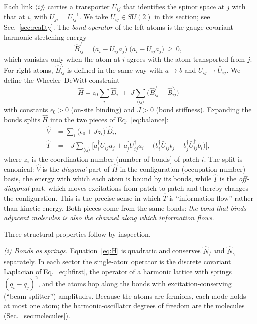 \documentclass[reprint,aps,prd,amsmath,amssymb,superscriptaddress,nofootinbib,floatfix]{revtex4-2}
\theoremstyle{plain}
\theoremstyle{definition}
\theoremstyle{remark}
\newcommand{\Lat}{\ensuremath{/}}                 %
\newcommand{\Rat}{\ensuremath{\backslash}}        %
\newcommand{\Hc}{\hat{H}}
\newcommand{\Tc}{\hat{T}}
\newcommand{\Vc}{\hat{V}}
\newcommand{\SU}{SU(2)}
\begin{document}
Each link $\langle ij\rangle$ carries a transporter $U_{ij}$ that identifies the spinor space at $j$ with that at
$i$, with $U_{ji}=U_{ij}^{-1}$. We take $U_{ij}\in\SU$ in this section; see Sec.~\ref{sec:reality}. The
\emph{bond operator} of the left atoms is the gauge-covariant harmonic stretching energy
\begin{equation}
\hat B^{\Lat}_{ij}=\big(a_i-U_{ij}a_j\big)^\dagger\big(a_i-U_{ij}a_j\big)\ \ge\ 0 ,
\label{eq:bond}
\end{equation}
which vanishes only when the atom at $i$ agrees with the atom transported from $j$. For right atoms,
$\hat B^{\Rat}_{ij}$ is defined in the same way with $a\to b$ and $U_{ij}\to\bar U_{ij}$. We define the
Wheeler--DeWitt constraint
\begin{equation}
\boxed{\;
\Hc=\epsilon_0\sum_i\hat D_i\;+\;J\sum_{\langle ij\rangle}\Big(\hat B^{\Lat}_{ij}-\hat B^{\Rat}_{ij}\Big)
\;}
\label{eq:H}
\end{equation}
with constants $\epsilon_0>0$ (on-site binding) and $J>0$ (bond stiffness). Expanding the bonds splits
$\Hc$ into the two pieces of Eq.~\eqref{eq:balance}:
\begin{align}
\Vc&=\sum_i\big(\epsilon_0+Jz_i\big)\,\hat D_i,
\label{eq:V}\\
\Tc&=-J\sum_{\langle ij\rangle}\Big[a_i^\dagger U_{ij}a_j+a_j^\dagger U_{ij}^\dagger a_i
-\big(b_i^\dagger\bar U_{ij}b_j+b_j^\dagger\bar U_{ij}^\dagger b_i\big)\Big],
\label{eq:T}
\end{align}
where $z_i$ is the coordination number (number of bonds) of patch $i$. The split is canonical: $\Vc$ is
the \emph{diagonal} part of $\Hc$ in the configuration (occupation-number) basis, the energy with which
each atom is bound by its bonds, while $\Tc$ is the \emph{off-diagonal} part, which moves excitations
from patch to patch and thereby changes the configuration. This is the precise sense in which $\Tc$ is
``information flow'' rather than kinetic energy. Both pieces come from the same bonds: \emph{the bond that
binds adjacent molecules is also the channel along which information flows}.

Three structural properties follow by inspection.

\emph{(i) Bonds as springs.} Equation~\eqref{eq:H} is quadratic and conserves $\hat N_\Lat$ and $\hat N_\Rat$
separately. In each sector the single-atom operator is the discrete covariant Laplacian of Eq.~\eqref{eq:hfirst}, the
operator of a harmonic lattice with springs $(q_i-q_j)^2$, and the atoms hop along the bonds with
excitation-conserving (``beam-splitter'') amplitudes. Because the atoms are fermions, each mode holds at most one
atom; the harmonic-oscillator degrees of freedom are the molecules (Sec.~\ref{sec:molecules}).
\end{document}
